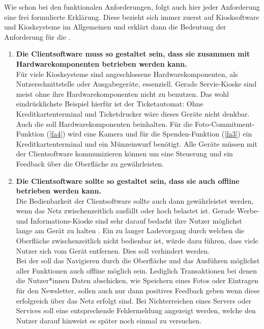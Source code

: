 Wie schon bei den funktionalen Anforderungen, folgt auch hier jeder Anforderung eine frei formulierte Erklärung. 
Diese bezieht sich immer zuerst auf Kiosksoftware und Kiosksysteme im Allgemeinen und erklärt dann die Bedeutung
der Anforderung für die \shst{}.

\begin{enumerate}[label=\textbf{NFA\arabic*}]
	\item\label{nfa1} \textbf{Die Clientsoftware muss so gestaltet sein, dass sie zusammen mit Hardwarekomponenten 
  betrieben werden kann.}\\
  Für viele Kiosksysteme sind angeschlossene Hardwarekomponenten, als Nutzerschnittstelle oder Ausgabegeräte, essenziell.
  Gerade Servie-Kioske sind meist ohne ihre Hardwarekomponenten nicht zu benutzen. Das wohl eindrücklichste
  Beispiel hierfür ist der Ticketautomat: Ohne Kreditkartenterminal und Ticketdrucker wäre dieses Geräte nicht denkbar.\\
  Auch die \shst{} soll Hardwarekomponenten beinhalten. Für die Foto-Commitment-Funktion (\ref{fa4}) wird eine
  Kamera und für die Spenden-Funktion (\ref{fa3}) ein Kreditkartenterminal und ein Münzeinwurf benötigt. Alle 
  Geräte müssen mit der Clientsoftware kommunizieren können um eine Steuerung und ein Feedback über die Oberfläche
  zu gewährleisten. 
	\item\label{nfa2} \textbf{Die Clientsoftware sollte so gestaltet sein, dass sie auch offline 
  betrieben werden kann.}\\
  Die Bedienbarkeit der Clientsoftware sollte auch dann gewährleistet werden, wenn das Netz zwischenzeitlich
  ausfällt oder hoch belastet ist. Gerade Werbe- und Informations-Kioske sind sehr darauf bedacht ihre
  Nutzer möglichst lange am Gerät zu halten \cite{across}. Ein zu langer Ladevorgang durch welchen die 
  Oberfläche zwischenzeitlich nicht bedienbar ist, würde dazu führen, dass viele Nutzer sich 
  vom Gerät entfernen. Dies soll verhindert werden.\\
  Bei der \shst{} soll das Navigieren durch die Oberfläche und das Ausführen möglichst aller Funktionen 
  auch offline möglich sein. Lediglich Transaktionen bei denen die Nutzer*innen Daten abschicken, wie Speichern 
  eines Fotos oder Eintragen für den Newsletter, sollen auch nur dann positives Feedback geben wenn 
  diese erfolgreich über das Netz erfolgt sind. Bei Nichterreichen eines Servers oder Services soll eine entsprechende
  Fehlermeldung angezeigt werden, welche den Nutzer darauf hinweist es später noch einmal zu versuchen.

\end{enumerate}
